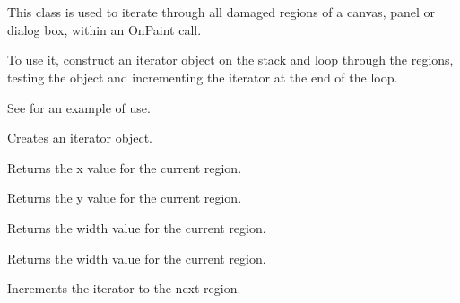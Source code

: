 \section{}\label{wxupdateiterator}

This class is used to iterate through all damaged regions of a canvas, panel
or dialog box, within an OnPaint call.

To use it, construct an iterator object on the stack and loop through the
regions, testing the object and incrementing the iterator at the end of the loop.

See  for an example of use.








Creates an iterator object.



Returns the x value for the current region.



Returns the y value for the current region.



Returns the width value for the current region.



Returns the width value for the current region.



Increments the iterator to the next region.


